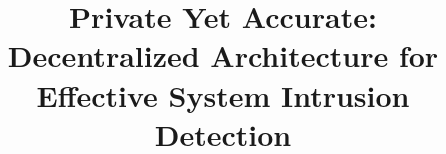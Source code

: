 \documentclass[conference]{IEEEtran}
\begin{document}
\title{Private Yet Accurate: Decentralized Architecture for Effective System Intrusion Detection}

\maketitle


% 
% 


% 


% 



% 


% 
% 

% 
% 
% 

\balance

{
\footnotesize
\setlength{\bibsep}{3pt}
}

\end{document}
